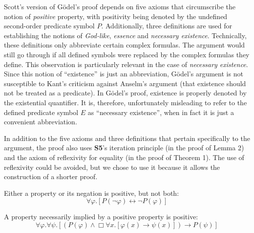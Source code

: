 \documentclass[smallextended]{svjour3}
\newcommand{\imp}{\rightarrow}
\newcommand{\biimp}{\leftrightarrow}
\newcommand{\all}{\forall}
\newcommand{\nec}{\Box} %
\begin{document}
Scott's version of G\"odel's proof depends on five axioms that circumscribe the notion of \emph{positive} property, with positivity being denoted by the undefined second-order predicate symbol $P$. Additionally, three definitions are used for establishing the notions of \emph{God-like}, \emph{essence} and \emph{necessary existence}. Technically, these definitions only abbreviate certain complex formulas. The argument would still go through if all defined symbols were replaced by the complex formulas they define. This observation is particularly relevant in the case of \emph{necessary existence}. Since this notion of ``existence'' is just an abbreviation, G\"odel's argument is not susceptible to Kant's criticism against Anselm's argument (that existence should not be treated as a predicate). In G\"odel's proof, existence is properly denoted by the existential quantifier. It is, therefore, unfortunately misleading to refer to the defined predicate symbol $E$ as ``necessary existence'', when in fact it is just a convenient abbreviation.

In addition to the five axioms and three definitions that pertain specifically to the argument, the proof also uses {\bf S5}'s iteration principle (in the proof of Lemma 2) and the axiom of reflexivity for equality (in the proof of Theorem 1). The use of reflexivity could be avoided, but we chose to use it because it allows the construction of a shorter proof. 


\begin{axiom}
\label{A1}
Either a property or its negation is positive, but not both:
$$
\all \varphi. [P(\neg \varphi) \biimp \neg P(\varphi)]
$$
\end{axiom}

\begin{axiom}
\label{A2}
A property necessarily implied by a positive property is positive:
$$
\all \varphi. \all \psi.[(P(\varphi) \wedge \nec \all x.[\varphi(x) \imp \psi(x)]) \imp P(\psi)]
$$
\end{axiom}
\end{document}
